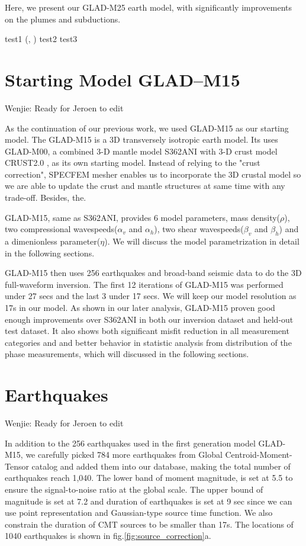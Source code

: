 \documentclass[extra,mreferee]{gji}
\begin{document}
Here, we present our GLAD-M25 earth model, with significantly improvements on the plumes and subductions.

test1 (\cite{zhu2012structure}, \cite{zhu2012structure})
test2 \citep{zhu2015seismic, ekstrom2012global}
test3 \citet{ekstrom2012global}


\section{Starting Model GLAD--M15}

{\color{Red} Wenjie: Ready for Jeroen to edit}

As the continuation of our previous work, we used GLAD-M15 as our
starting model\citep{bozdaug2016global}.
The GLAD-M15 is a 3D transversely isotropic earth model. Its uses
GLAD-M00, a combined 3-D mantle model S362ANI \citep{kustowski2008anisotropic}
with 3-D crust model CRUST2.0 \citep{bassin2000current}, as its own starting model.
Instead of relying to the "crust correction", SPECFEM mesher enables us to incorporate
the 3D crustal model so we are able to update the crust and mantle structures at same
time with any trade-off. Besides, the.

GLAD-M15, same as  S362ANI, provides 6 model parameters, mass density($\rho$), two compressional
wavespeeds($\alpha_v$ and $\alpha_h$), two shear wavespeeds($\beta_v$
and $\beta_h$) and a dimenionless parameter($\eta$). We will discuss
the model parametrization in detail in the following sections.

GLAD-M15 then uses 256 earthquakes and broad-band seismic data to do the 3D full-waveform
inversion\citep{bozdaug2016global}. The first 12 iterations of GLAD-M15 was
performed under 27 secs and the last 3 under 17 secs. We will keep our model
resolution as 17s in our model. As shown in our later analysis,
GLAD-M15 proven good enough improvements over S362ANI in both our inversion
dataset and held-out test dataset. It also shows both significant misfit reduction
in all measurement categories and and better behavior in statistic analysis from distribution
of the phase measurements, which will discussed in the following sections.

\section{Earthquakes}

{\color{Red} Wenjie: Ready for Jeroen to edit}

In addition to the 256 earthquakes used in the first generation model GLAD-M15, we
carefully picked 784 more earthquakes from Global Centroid-Moment-Tensor catalog\citep{}
and added them into our database, making the total number of earthquakes reach 1,040.
The lower band of moment magnitude, is set at 5.5 to ensure the signal-to-noise ratio at
the global scale. The upper bound of magnitude is set at 7.2 and duration of earthquakes
is set at 9 sec since we can use point representation and Gaussian-type source
time function.
We also constrain the duration of CMT sources to be smaller than 17s.
The locations of 1040 earthquakes is shown in fig.\ref{fig:source_correction}a.
\end{document}
